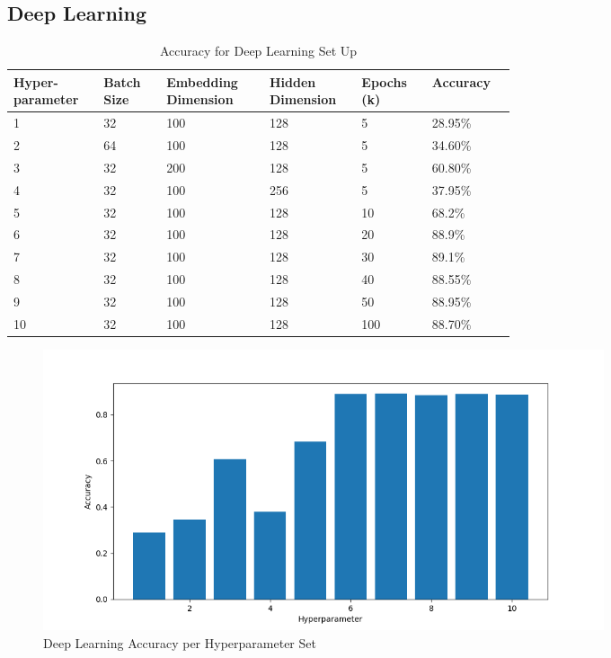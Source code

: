\subsection{Deep Learning}

\begin{table}[H]
\begin{center}
\centering
\begin{tabular}{|| p{0.1\linewidth} | p{0.1\linewidth} | p{0.15\linewidth} | p{0.1\linewidth} | p{0.1\linewidth} | p{0.1\linewidth} ||}
    \hline
    Hyper-parameter & Batch Size & Embedding Dimension & Hidden Dimension & Epochs (k) & Accuracy \\
    \hline
    1 & 32 & 100 & 128 & 5 & 28.95\% \\
    2 & 64 & 100 & 128 & 5 & 34.60\% \\
    3 & 32 & 200 & 128 & 5 & 60.80\% \\
    4 & 32 & 100 & 256 & 5 & 37.95\% \\
    5 & 32 & 100 & 128 & 10 & 68.2\% \\
    6 & 32 & 100 & 128 & 20 & 88.9\% \\
    7 & 32 & 100 & 128 & 30 & 89.1\% \\
    8 & 32 & 100 & 128 & 40 & 88.55\% \\
    9 & 32 & 100 & 128 & 50 & 88.95\% \\
    10 & 32 & 100 & 128 & 100 & 88.70\% \\
    \hline
\end{tabular}
\caption[Deep Learning Results]{Accuracy for Deep Learning Set Up}
\label{tab:dl-results}
\end{center}
\end{table}

\begin{figure}[H]
    \centering
    \includegraphics*[width=0.8\textwidth]{images/acc-bar-dl.png}
    \caption{Deep Learning Accuracy per Hyperparameter Set}
    \label{fig:dl-results}
\end{figure}

